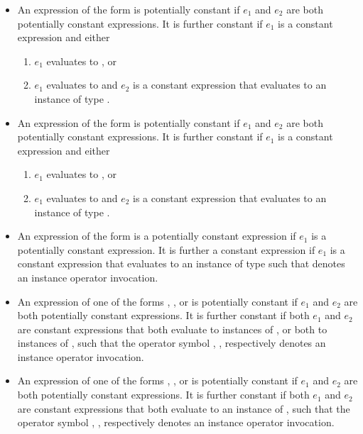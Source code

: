 \documentclass[makeidx]{article}
\begin{document}
{\begin{itemize}
\item
  An expression of the form  is
  potentially constant if $e_1$ and $e_2$
  are both potentially constant expressions.
  It is further constant if $e_1$ is a constant expression and either
  \begin{enumerate}
  \item $e_1$ evaluates to \FALSE, or
  \item $e_1$ evaluates to \TRUE{} and $e_2$ is a constant expression
    that evaluates to an instance of type .
  \end{enumerate}

\item
  An expression of the form  is
  potentially constant if $e_1$ and $e_2$
  are both potentially constant expressions.
  It is further constant if $e_1$ is a constant expression and either
  \begin{enumerate}
  \item $e_1$ evaluates to \TRUE, or
  \item $e_1$ evaluates to \FALSE{} and $e_2$ is a constant expression
    that evaluates to an instance of type .
  \end{enumerate}

\item
  An expression of the form  is
  a potentially constant expression
  if $e_1$ is a potentially constant expression.
  It is further a constant expression if $e_1$ is
  a constant expression that evaluates to an instance of type 
  such that \gtilde{} denotes an instance operator invocation.

\item An expression of one of the forms ,
  , or  is potentially constant
  if $e_1$ and $e_2$ are both potentially constant expressions.
  It is further constant if both $e_1$ and $e_2$ are constant expressions that
  both evaluate to instances of ,
  or both to instances of ,
  such that the operator symbol
  \lit{\&}, \lit{|}, respectively \lit{\^}
  denotes an instance operator invocation.

\item An expression of one of the forms
  , ,
  or  is potentially constant
  if $e_1$ and $e_2$ are both potentially constant expressions.
  It is further constant if both $e_1$ and $e_2$ are constant expressions that
  both evaluate to an instance of ,
  such that the operator symbol
  \lit{\gtgt}, \lit{\gtgtgt}, respectively \lit{\ltlt}
  denotes an instance operator invocation.


\end{itemize}}
\end{document}
